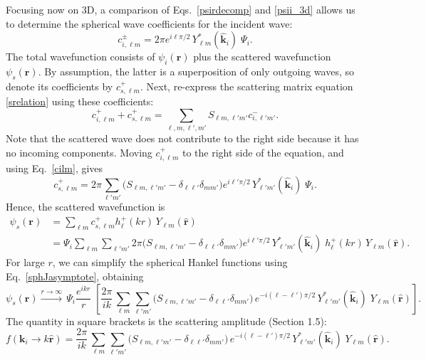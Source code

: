 \documentclass[pra,12pt]{revtex4}
\begin{document}
Focusing now on 3D, a comparison of Eqs.~\eqref{psirdecomp} and
\eqref{psii_3d} allows us to determine the spherical wave coefficients
for the incident wave:
\begin{equation}
  c^{\pm}_{i, \ell m} = 2 \pi e^{i\ell\pi/2} \,
  Y_{\ell m}^*(\hat{\mathbf{k}}_i)\; \Psi_i.
  \label{cilm}
\end{equation}
The total wavefunction consists of $\psi_i(\mathbf{r})$ plus the
scattered wavefunction $\psi_s(\mathbf{r})$.  By assumption, the
latter is a superposition of only outgoing waves, so denote its
coefficients by $c^+_{s,\ell m}$.  Next, re-express the scattering
matrix equation \eqref{srelation} using these coefficients:
\begin{equation}
  c^+_{i,\ell m} + c^+_{s,\ell m}
  = \sum_{\ell, m, \ell', m'} S_{\ell m, \ell'm'} c^-_{i,\ell'm'}.
\end{equation}
Note that the scattered wave does not contribute to the right side
because it has no incoming components.  Moving $c_{i,\ell m}^+$ to the
right side of the equation, and using Eq.~\eqref{cilm}, gives
\begin{equation}
  c^+_{s,\ell m} = 2 \pi \sum_{\ell' m'} \Big(S_{\ell m, \ell' m'}
  - \delta_{\ell \ell'}\delta_{mm'}\Big) e^{i\ell'\pi/2} \,
  Y_{\ell' m'}^*(\hat{\mathbf{k}}_i)\; \Psi_i.
\end{equation}
Hence, the scattered wavefunction is
\begin{equation}
  \begin{aligned}\psi_s(\mathbf{r}) &= \sum_{\ell m} c^+_{s,\ell m} h_{\ell}^+(kr) \, Y_{\ell m}(\hat{\mathbf{r}}) \\ &= \Psi_i \sum_{\ell m} \sum_{\ell' m'} 2 \pi \Big(S_{\ell m, \ell' m'} - \delta_{\ell \ell'}\delta_{mm'}\Big) e^{i\ell'\pi/2} \, Y_{\ell' m'}^*(\hat{\mathbf{k}}_i)\; h_{\ell}^+(kr) \, Y_{\ell m}(\hat{\mathbf{r}}).\end{aligned}
\end{equation}
For large $r$, we can simplify the spherical Hankel functions using
Eq.~\eqref{sphJasymptote}, obtaining
\begin{equation}
  \psi_s(\mathbf{r}) \overset{r\rightarrow\infty}{\longrightarrow} \, \Psi_i \frac{e^{ikr}}{r} \; \left[ \frac{2 \pi}{ik}\, \sum_{\ell m} \sum_{\ell' m'} \Big(S_{\ell m, \ell' m'} - \delta_{\ell \ell'}\delta_{mm'}\Big) \, e^{-i(\ell-\ell')\pi/2} \, Y_{\ell' m'}^*(\hat{\mathbf{k}}_i)\; Y_{\ell m}(\hat{\mathbf{r}})\right].
\end{equation}
The quantity in square brackets is the scattering amplitude (Section
1.5):
\begin{equation}
  f(\mathbf{k}_i \rightarrow k\hat{\mathbf{r}}) =  \frac{2 \pi}{ik}\, \sum_{\ell m} \sum_{\ell' m'} \Big(S_{\ell m, \ell' m'} - \delta_{\ell \ell'}\delta_{mm'}\Big) \, e^{-i(\ell-\ell')\pi/2} \, Y_{\ell' m'}^*(\hat{\mathbf{k}}_i)\; Y_{\ell m}(\hat{\mathbf{r}}).
  \label{3dfrelation}
\end{equation}
\end{document}
